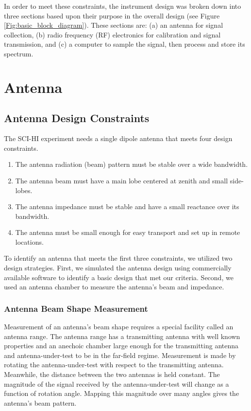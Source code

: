 In order to meet these constraints, the instrument design was broken down into three sections based upon their purpose in the overall design (see Figure \ref{Fig:basic_block_diagram}). These sections are: (a) an antenna for signal collection, (b) radio frequency (RF) electronics for calibration and signal transmission, and (c) a computer to sample the signal, then process and store its spectrum. 



\section{Antenna}


\subsection{Antenna Design Constraints}

The SCI-HI experiment needs a single dipole antenna that meets four design constraints. 

\begin{enumerate}

\item The antenna radiation (beam) pattern must be stable over a wide bandwidth. 

\item The antenna beam must have a main lobe centered at zenith and small side-lobes. 

\item The antenna impedance must be stable and have a small reactance over its bandwidth. 

\item The antenna must be small enough for easy transport and set up in remote locations. 

\end{enumerate}

To identify an antenna that meets the first three constraints, we utilized two design strategies. First, we simulated the antenna design using commercially available software to identify a basic design that met our criteria. Second, we used an antenna chamber to measure the antenna's beam and impedance. 

\subsubsection{Antenna Beam Shape Measurement}

Measurement of an antenna's beam shape requires a special facility called an antenna range. The antenna range has a transmitting antenna with well known properties and an anechoic chamber large enough for the transmitting antenna and antenna-under-test to be in the far-field regime. Measurement is made by rotating the antenna-under-test with respect to the transmitting antenna. Meanwhile, the distance between the two antennas is held constant. The magnitude of the signal received by the antenna-under-test will change as a function of rotation angle. Mapping this magnitude over many angles gives the antenna's beam pattern. 

